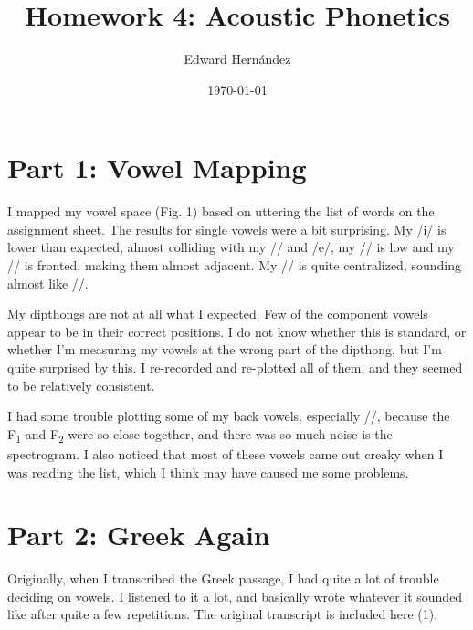 \documentclass[doc,12pt]{apa6}
\begin{document}
\title{Homework 4: Acoustic Phonetics}
\author{Edward Hern\'{a}ndez}
\date{\today}
\maketitle

\section{Part 1: Vowel Mapping}

I mapped my vowel space (Fig. 1) based on uttering the list of words on the
assignment sheet. The results for single vowels were a bit surprising. My /i/
is lower than expected, almost colliding with my // and /e/, my
// is low and my // is fronted, making them almost
adjacent.  My // is quite centralized, sounding almost like
//.

My dipthongs are not at all what I expected. Few of the component vowels appear
to be in their correct positions. I do not know whether this is standard, or
whether I'm measuring my vowels at the wrong part of the dipthong, but I'm
quite surprised by this. I re-recorded and re-plotted all of them, and they
seemed to be relatively consistent.

I had some trouble plotting some of my back vowels, especially //,
because the F\textsubscript{1} and F\textsubscript{2} were so close together,
and there was so much noise is the spectrogram. I also noticed that most of
these vowels came out creaky when I was reading the list, which I think may
have caused me some problems.

\section{Part 2: Greek Again}

Originally, when I transcribed the Greek passage, I had quite a lot of trouble
deciding on vowels. I listened to it a lot, and basically wrote whatever it
sounded like after quite a few repetitions. The original transcript is included
here (1).

\begin{exe}
	\ex {}
\end{exe}
\end{document}
